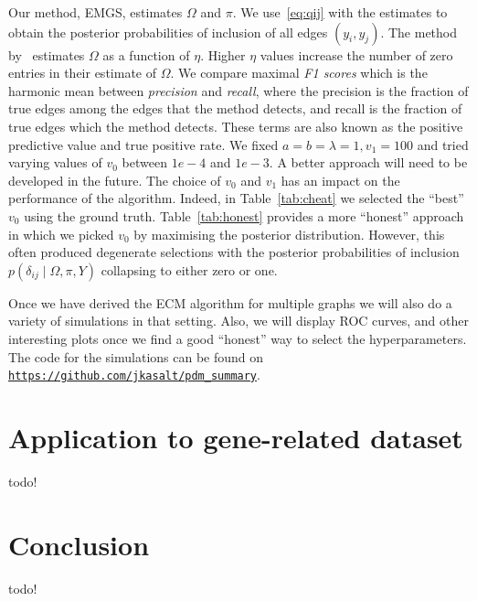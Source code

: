 \documentclass[a4paper, 11pt, oneside]{report}
\newcommand{\1}{\mathds{1}}
\begin{document}
Our method, EMGS, estimates $\Omega$ and $\pi$. We use~\eqref{eq:qij} with the
estimates to obtain the posterior probabilities of inclusion of all edges
$(y_i, y_j)$. The method by~\cite{mein2006} estimates $\Omega$ as a function of
$\eta$. Higher $\eta$ values increase the number of zero entries in their
estimate of $\Omega$.
We compare maximal \emph{F1 scores} which is the harmonic mean between \emph{precision}
and \emph{recall}, where the precision is the fraction of true edges
among the edges that the method detects, and recall is the fraction
of true edges which the method detects. These terms are also known as the
positive predictive value and true positive rate.
We fixed $a = b = \lambda = 1, v_1 = 100$ and tried varying
values of $v_0$ between $1e-4$ and $1e-3$.
A better approach will need to be developed in the future.
The choice of $v_0$ and $v_1$ has an impact on the performance of the algorithm.
Indeed, in Table~\ref{tab:cheat} we selected the ``best'' $v_0$ using the ground truth.
Table~\ref{tab:honest} provides a more ``honest'' approach in which we picked $v_0$ by
maximising the posterior distribution.
However, this often produced degenerate selections with the posterior
probabilities of inclusion $p(\delta_{ij} \mid \Omega, \pi, Y)$ collapsing to
either zero or one.

Once we have derived the ECM algorithm for multiple graphs we will also do a
variety of simulations in that setting. Also, we will display ROC curves, and
other interesting plots once we find a good ``honest'' way to select the
hyperparameters. The code for the simulations can be found on
\href{https://github.com/jkasalt/pdm_summary}{\texttt{https://github.com/jkasalt/pdm\_summary}}.

\chapter{Application to gene-related dataset}
todo!

\chapter{Conclusion}
todo!
\cleardoublepage
{}
{}
\printbibliography
\end{document}
